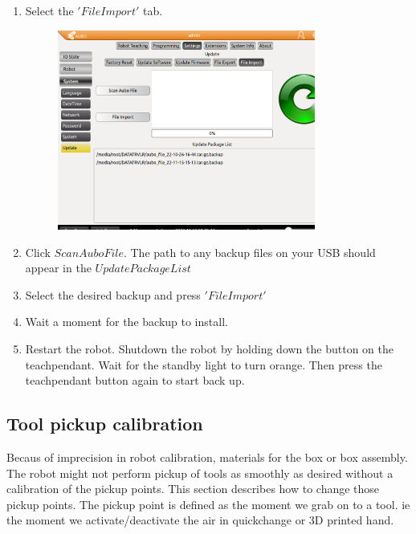 \documentclass{article}
\begin{document}
\begin{enumerate}
\item Select the $'File Import'$ tab.
\begin{figure}[H]\centering
  \includegraphics[width=0.8\textwidth]{../../Images/FileImport.png}
\end{figure}
\item Click $Scan Aubo File$. The path to any backup files on your USB should appear in the $Update Package List$
\item Select the desired backup and press $'File Import'$
\item Wait a moment for the backup to install. 
\item Restart the robot. Shutdown the robot by holding down the button on the teachpendant. Wait for the standby light to turn orange. Then press the teachpendant button again to start back up.
\end{enumerate}

\subsection{Tool pickup calibration} 
Becaus of imprecision in robot calibration, materials for the box or box assembly. The robot might not perform pickup of tools as smoothly as desired without a calibration of the pickup points. This section describes how to change those pickup points. 
The pickup point is defined as the moment we grab on to a tool. ie the moment we activate/deactivate the air in quickchange or 3D printed hand. 
\end{document}
